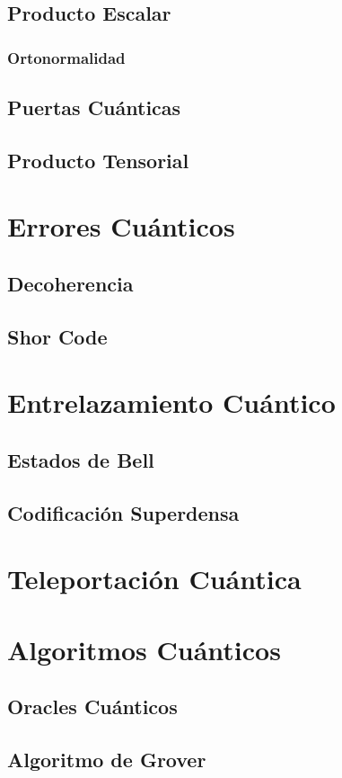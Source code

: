 \documentclass{article}
\numberwithin{equation}{section} %
\begin{document}
    \subsection{Producto Escalar}
    \subsubsection{Ortonormalidad}
    \subsection{Puertas Cuánticas}
    \subsection{Producto Tensorial}
    \section{Errores Cuánticos}
    \subsection{Decoherencia}
    \subsection{Shor Code}
    \section{Entrelazamiento Cuántico}
    \subsection{Estados de Bell}
    \subsection{Codificación Superdensa}
    \section{Teleportación Cuántica}
    \section{Algoritmos Cuánticos}
    \subsection{Oracles Cuánticos}
    \subsection{Algoritmo de Grover}
\end{document}
